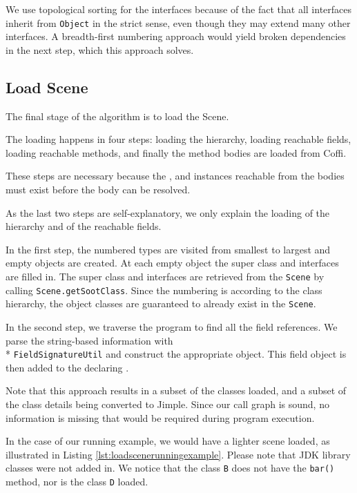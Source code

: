 \documentclass[preprint]{sigplanconf}
\begin{document}
We use topological sorting for the interfaces because of the fact that all interfaces inherit from {\tt Object} in the strict sense, even though they may extend many other interfaces. A breadth-first numbering approach would yield broken dependencies in the next step, which this approach solves. 

\subsection{Load Scene}
\label{sec:loadscene}
The final stage of the algorithm is to load the Scene. 

The loading happens in four steps: loading the hierarchy, loading reachable fields, loading reachable methods, and finally the method bodies are loaded from Coffi.

These steps are necessary because the \sootclass, \sootfield and \sootmethod instances reachable from the bodies must exist before the body can be resolved.

As the last two steps are self-explanatory, we only explain the loading of the hierarchy and of the reachable fields.

In the first step, the numbered types are visited from smallest to largest and empty \sootclass objects are created. At each empty \sootclass object the super class and interfaces are filled in. The super class and interfaces are retrieved from the {\tt Scene} by calling {\tt Scene.getSootClass}. Since the numbering is according to the class hierarchy, the object classes are guaranteed to already exist in the {\tt Scene}.

In the second step, we traverse the program to find all the field references. We parse the string-based information with \\*
{\tt FieldSignatureUtil} and construct the appropriate \sootfield object. This field object is then added to the declaring \sootclass.


Note that this approach results in a subset of the classes loaded, and a subset of the class details being converted to Jimple. Since our call graph is sound, no information is missing that would be required during program execution.

In the case of our running example, we would have a lighter scene loaded, as illustrated in Listing \ref{lst:loadscenerunningexample}. Please note that JDK library classes were not added in. We notice that the class {\tt B} does not have the {\tt bar()} method, nor is the class {\tt D} loaded.
\end{document}
